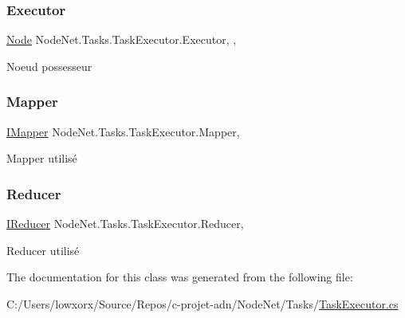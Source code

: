 \subsubsection{\texorpdfstring{Executor}{Executor}}
{\footnotesize\ttfamily \hyperlink{class_node_net_1_1_network_1_1_nodes_1_1_node}{Node} Node\+Net.\+Tasks.\+Task\+Executor.\+Executor\hspace{0.3cm}{\ttfamily [get]}, {\ttfamily [set]}, {\ttfamily [protected]}}



Noeud possesseur 

\mbox{\label{class_node_net_1_1_tasks_1_1_task_executor_aa4f120494ffb855dfcd54d6db8e8e8a3}} 
\subsubsection{\texorpdfstring{Mapper}{Mapper}}
{\footnotesize\ttfamily \hyperlink{interface_node_net_1_1_map___reduce_1_1_i_mapper}{I\+Mapper} Node\+Net.\+Tasks.\+Task\+Executor.\+Mapper\hspace{0.3cm}{\ttfamily [get]}, {\ttfamily [set]}}



Mapper utilisé 

\mbox{\label{class_node_net_1_1_tasks_1_1_task_executor_abf048f920835d49ef8333f7be7249de1}} 
\subsubsection{\texorpdfstring{Reducer}{Reducer}}
{\footnotesize\ttfamily \hyperlink{interface_node_net_1_1_map___reduce_1_1_i_reducer}{I\+Reducer} Node\+Net.\+Tasks.\+Task\+Executor.\+Reducer\hspace{0.3cm}{\ttfamily [get]}, {\ttfamily [set]}}



Reducer utilisé 



The documentation for this class was generated from the following file\+:\begin{DoxyCompactItemize}
\item 
C\+:/\+Users/lowxorx/\+Source/\+Repos/c-\/projet-\/adn/\+Node\+Net/\+Tasks/\hyperlink{_task_executor_8cs}{Task\+Executor.\+cs}\end{DoxyCompactItemize}
